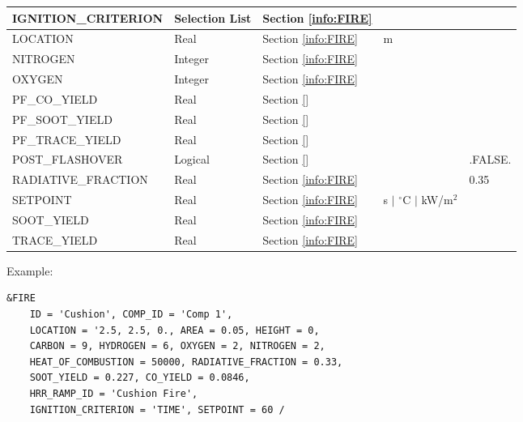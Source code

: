 \begin{longtable}{@{\extracolsep{\fill}}|l|l|l|l|l|}
{\ct IGNITION\_CRITERION}  & Selection List         & Section \ref{info:FIRE}                 &                             &                 \\ \hline
{\ct LOCATION}        & Real        & Section \ref{info:FIRE}                 & m                           &                 \\ \hline
{\ct NITROGEN}             & Integer     & Section \ref{info:FIRE}                 &                             &                 \\ \hline
{\ct OXYGEN}               & Integer     & Section \ref{info:FIRE}                 &                             &                 \\ \hline
{\ct PF\_CO\_YIELD}        & Real        & Section \ref{}                 &                             &                 \\ \hline
{\ct PF\_SOOT\_YIELD}      & Real        & Section \ref{}                 &                             &                 \\ \hline
{\ct PF\_TRACE\_YIELD}     & Real        & Section \ref{}                 &                             &                 \\ \hline
{\ct POST\_FLASHOVER}      & Logical     & Section \ref{}                 &                             &    {\ct .FALSE.}    \\ \hline
{\ct RADIATIVE\_FRACTION}  & Real        & Section \ref{info:FIRE}                 &                             &     0.35        \\ \hline
{\ct SETPOINT}             & Real        & Section \ref{info:FIRE}                 & s $\mid$ $^\circ$C $\mid$ kW/m$^2$  &                 \\ \hline
{\ct SOOT\_YIELD}          & Real        & Section \ref{info:FIRE}                 &                             &                 \\ \hline
{\ct TRACE\_YIELD}         & Real        & Section \ref{info:FIRE}                 &                             &                 \\ \hline
\end{longtable}


\vspace{\baselineskip}
\noindent Example:
\begin{lstlisting}
&FIRE
	ID = 'Cushion', COMP_ID = 'Comp 1',
	LOCATION = '2.5, 2.5, 0., AREA = 0.05, HEIGHT = 0,
	CARBON = 9, HYDROGEN = 6, OXYGEN = 2, NITROGEN = 2,
	HEAT_OF_COMBUSTION = 50000, RADIATIVE_FRACTION = 0.33,
	SOOT_YIELD = 0.227, CO_YIELD = 0.0846,
	HRR_RAMP_ID = 'Cushion Fire',
	IGNITION_CRITERION = 'TIME', SETPOINT = 60 /
\end{lstlisting}




